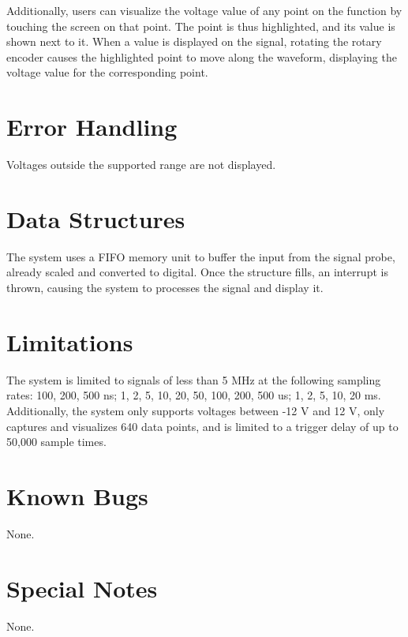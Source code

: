 \documentclass{scrartcl}
\begin{document}
	Additionally, users can visualize the voltage value of any point on the function by touching the screen on that point. The point is thus highlighted, and its value is shown next to it. When a value is displayed on the signal, rotating the rotary encoder causes the highlighted point to move along the waveform, displaying the voltage value for the corresponding point.
	
	\section*{Error Handling}
	Voltages outside the supported range are not displayed.

	\section*{Data Structures}
	The system uses a FIFO memory unit to buffer the input from the signal probe, already scaled and converted to digital. Once the structure fills, an interrupt is thrown, causing the system to processes the signal and display it.
	
	\section*{Limitations}
	The system is limited to signals of less than 5 MHz at the following sampling rates: 100, 200, 500 ns; 1, 2, 5, 10, 20, 50, 100, 200, 500 us; 1, 2, 5, 10, 20 ms. Additionally, the system only supports voltages between -12 V and 12 V, only captures and visualizes 640 data points, and is limited to a trigger delay of up to 50,000 sample times.
	
	\section*{Known Bugs}
	None.
		
	\section*{Special Notes}
	None.
	
	
\end{document}
